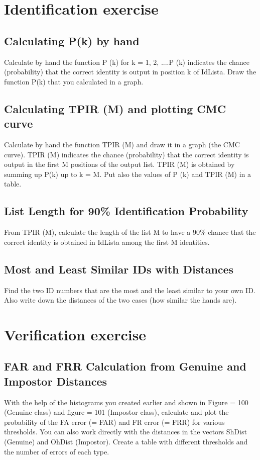 \documentclass[a4paper,12pt]{article}
\begin{document}
\section{Identification exercise}

\subsection{Calculating P(k) by hand}
Calculate by hand the function P (k) for k = 1, 2, ....P (k) indicates the chance (probability) that the correct identity is output in position k of IdLista. Draw the function P(k) that you calculated in a graph.

\subsection{Calculating TPIR (M) and plotting CMC curve}
Calculate by hand the function TPIR (M) and draw it in a graph (the CMC curve). 
TPIR (M) indicates the chance (probability) that the correct identity is output in the first M positions of the output list.  TPIR (M) is obtained by summing up P(k) up to k = M.
Put also the values of P (k) and TPIR (M) in a table.


\subsection{List Length for 90\% Identification Probability}
From TPIR (M), calculate the length of the list M to have a 90\% chance that the correct identity is obtained in IdLista among the first M identities.

\subsection{Most and Least Similar IDs with Distances}
Find the two ID numbers that are the most and the least similar to your own ID. Also write down the distances of the two cases (how similar the hands are).


\section{Verification exercise}

\subsection{FAR and FRR Calculation from Genuine and Impostor Distances}
With the help of the histograms you created earlier and shown in Figure = 100 (Genuine class) and figure = 101 (Impostor class), calculate and plot the probability of the FA error (= FAR) and FR error (= FRR) for various thresholds. You can also work directly with the distances in the vectors ShDist (Genuine) and OhDist (Impostor). Create a table with different thresholds and the number of errors of each type.
\end{document}
